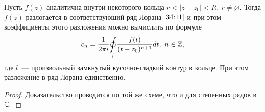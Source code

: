 \documentclass[../../main.tex]{subfiles}
\begin{document}
\begin{thm}
	Пусть $ f(z) $ аналитична внутри некоторого кольца $ r < |z - z_0| < R,\ r 
	\neq \varnothing $. Тогда $ f(z) $ разлогается в соответствующий ряд Лорана $ 
	\eqref{34:11} $ и при этом коэффициенты этого разложения можно вычислить по 
	формуле
	\begin{equation}\label{34:12}
		c_n = \frac{1}{2 \pi i} \underset{l}\oint\frac{f(t)}{(t - z_0)^{n + 1}} 
		dt,\ n \in \mathbb{Z},
	\end{equation}
	где $ l $~--- произвольный замкнутый кусочно-гладкий контур в кольце. При 
	этом разложение в ряд Лорана единственно.
\end{thm}

\begin{proof}
	Доказательство проводится по той же схеме, что и для степенных рядов в $\mathbb{C}$.
\end{proof}
\end{document}
